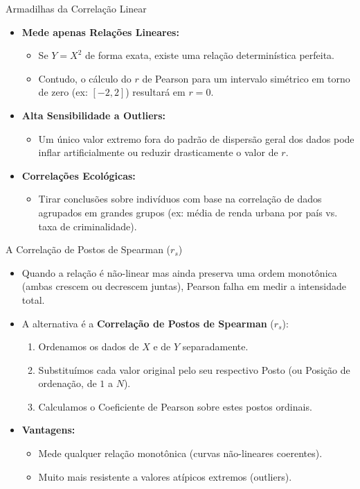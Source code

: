 \begin{frame}{Armadilhas da Correlação Linear}
    \begin{itemize}
        \item \textbf{Mede apenas Relações Lineares:}
        \begin{itemize}
            \item Se $Y = X^2$ de forma exata, existe uma relação determinística perfeita.
            \item Contudo, o cálculo do $r$ de Pearson para um intervalo simétrico em torno de zero (ex: $[-2, 2]$) resultará em $r = 0$.
        \end{itemize}
        \item \textbf{Alta Sensibilidade a Outliers:}
        \begin{itemize}
            \item Um único valor extremo fora do padrão de dispersão geral dos dados pode inflar artificialmente ou reduzir drasticamente o valor de $r$.
        \end{itemize}
        \item \textbf{Correlações Ecológicas:}
        \begin{itemize}
            \item Tirar conclusões sobre indivíduos com base na correlação de dados agrupados em grandes grupos (ex: média de renda urbana por país vs. taxa de criminalidade).
        \end{itemize}
    \end{itemize}
\end{frame}

\begin{frame}{A Correlação de Postos de Spearman ($r_s$)}
    \begin{itemize}
        \item Quando a relação é não-linear mas ainda preserva uma ordem monotônica (ambas crescem ou decrescem juntas), Pearson falha em medir a intensidade total.
        \item A alternativa é a \textbf{Correlação de Postos de Spearman} ($r_s$):
        \begin{enumerate}
            \item Ordenamos os dados de $X$ e de $Y$ separadamente.
            \item Substituímos cada valor original pelo seu respectivo Posto (ou Posição de ordenação, de $1$ a $N$).
            \item Calculamos o Coeficiente de Pearson sobre estes postos ordinais.
        \end{enumerate}
        \item \textbf{Vantagens:}
        \begin{itemize}
            \item Mede qualquer relação monotônica (curvas não-lineares coerentes).
            \item Muito mais resistente a valores atípicos extremos (outliers).
        \end{itemize}
    \end{itemize}
\end{frame}

